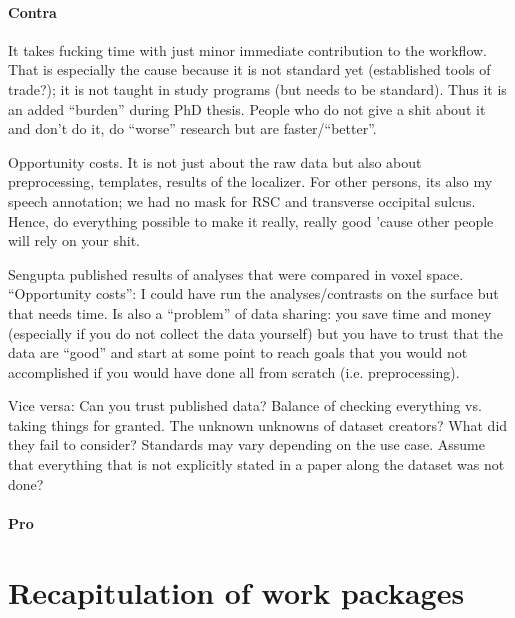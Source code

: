 \paragraph{Contra}

%
It takes fucking time with just minor immediate contribution to the workflow.
%
That is especially the cause because it is not standard yet (established tools
of trade?); it is not taught in study programs (but needs to be standard).
Thus it is an added ``burden'' during PhD thesis.
%
People who do not give a shit about it and don't do it, do ``worse'' research
but are faster/``better''.

%
Opportunity costs. It is not just about the raw data but also about
preprocessing, templates, results of the localizer. For other persons, its also
my speech annotation; we had no mask for RSC and transverse occipital sulcus.
%
Hence, do everything possible to make it really, really good 'cause other people
will rely on your shit.

%
Sengupta published results of analyses that were compared in voxel space.
%
``Opportunity costs'': I could have run the analyses/contrasts on the surface
but that needs time.
%
Is also a ``problem'' of data sharing: you save time and money (especially if
you do not collect the data yourself) but you have to trust that the data are
``good'' and start at some point to reach goals that you would not accomplished
if you would have done all from scratch (i.e. preprocessing).


%
Vice versa: Can you trust published data? Balance of checking everything vs.
taking things for granted.
%
The unknown unknowns of dataset creators? What did they fail to consider?
Standards may vary depending on the use case. Assume that everything that is not
explicitly stated in a paper along the dataset was not done?


\paragraph{Pro}




\section{Recapitulation of work packages}



